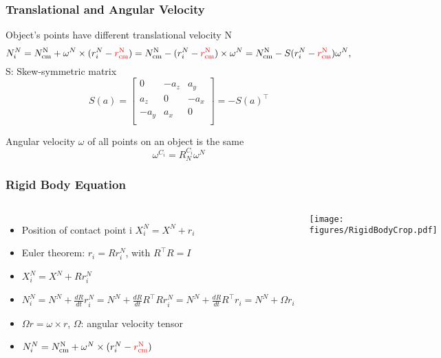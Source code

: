 \documentclass{beamer}
\begin{document}

\begin{frame}
\frametitle{Translational and Angular Velocity }
Object's points have different translational velocity N 
{\small \begin{equation*}
N_{i}^{N}=N_{\textrm{cm}}^{\textrm{N}} + \omega^N\times (r_{i}^{N}-{\color{red}r_{\textrm{cm}}^{\textrm{N}}}) = N_{\textrm{cm}}^{\textrm{N}} - (r_i^N-{\color{red}r_{\textrm{cm}}^{\textrm{N}}})\times \omega^N= N_{\textrm{cm}}^{\textrm{N}} - S(r_i^N-{\color{red}r_{\textrm{cm}}^{\textrm{N}}}) \omega^N,
\end{equation*}}
S: Skew-symmetric matrix 
\begin{equation*}
S(a)=\begin{bmatrix}
0 & -a_z & a_y \\
a_z & 0 & -a_x \\
-a_y& a_x & 0 \\
\end{bmatrix}=-S(a)^{\intercal}
\end{equation*}

Angular velocity $\omega$ of all points on an object is the same
\begin{equation*}
\omega^{C_i} = R_{N}^{C_i}\omega^{N}
\end{equation*}

\end{frame}


\begin{frame}
\frametitle{Rigid Body Equation}
\begin{columns}[c] 

\begin{itemize}
\item Position of contact point i $X^{N}_{i}=X^N + r_{i}$ \vspace{.2cm}
\item Euler theorem: $r_{i} = Rr_{i}^{N}$, with $R^{\intercal}R=I$ \vspace{.2cm}
\item $X^{N}_{i}=X^N + Rr_{i}^{N}$ \vspace{.2cm}
\item $N^{N}_{i}=N^N + \frac{dR}{dt} r_{i}^{N}=N^N + \frac{dR}{dt} R^{\intercal}Rr_{i}^{N}=N^N + \frac{dR}{dt} R^{\intercal}r_{i}= N^N + \Omega r_{i}$ \vspace{.2cm}
\item $\Omega r=\omega\times r $, $\Omega$: angular velocity tensor \vspace{.2cm}
\item $N_{i}^{N}=N_{\textrm{cm}}^{\textrm{N}} + \omega^N\times (r_{i}^{N}-{\color{red}r_{\textrm{cm}}^{\textrm{N}}})$
\end{itemize}

\centering
 \texttt{[image: figures/RigidBodyCrop.pdf]}
\end{columns}
\end{frame}
\end{document}

